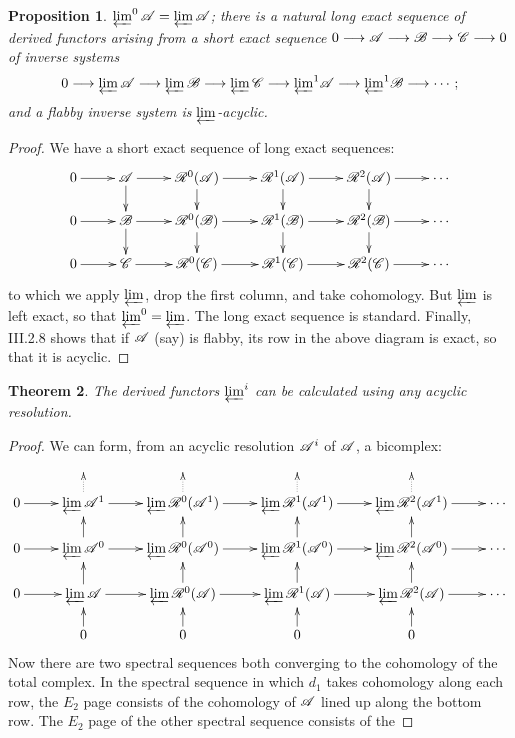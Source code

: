 \documentclass[11pt]{article}
\theoremstyle{plain}
\newtheorem{thm}{Theorem}[subsection]
\newtheorem{prop}[thm]{Proposition}
\theoremstyle{definition}
\begin{document}
{\begin{prop}
$\varprojlim^0\mathscr{A}=\varprojlim\mathscr{A}$; there is a natural long exact sequence of
derived functors arising from a short exact sequence
$0\longrightarrow\mathscr{A}\longrightarrow\mathscr{B}\longrightarrow\mathscr{C}\longrightarrow0$ of inverse systems\upcol
\[0\longrightarrow\varprojlim\mathscr{A}\longrightarrow\varprojlim\mathscr{B}\longrightarrow\varprojlim\mathscr{C}\longrightarrow
\textstyle{\varprojlim}^1\mathscr{A}\longrightarrow\textstyle{\varprojlim}^1\mathscr{B}\longrightarrow\cdots;\]
and a flabby inverse system is $\varprojlim$-acyclic.
\end{prop}
\begin{proof}We have a short exact sequence of long exact sequences:
\[\xymatrix@R=.5cm{
0\ar[r]&\scrA\ar[r]\ar[d]&\scrR^0(\scrA)\ar[r]\ar[d]&\scrR^1(\scrA)\ar[r]\ar[d]&
\scrR^2(\scrA)\ar[r]\ar[d]&\cdots\\
0\ar[r]&\scrB\ar[r]\ar[d]&\scrR^0(\scrB)\ar[r]\ar[d]&\scrR^1(\scrB)\ar[r]\ar[d]&
\scrR^2(\scrB)\ar[r]\ar[d]&\cdots\\
0\ar[r]&\scrC\ar[r]&\scrR^0(\scrC)\ar[r]&\scrR^1(\scrC)\ar[r]&\scrR^2(\scrC)
\ar[r]&\cdots
}\]
to which we apply $\varprojlim$, drop the first column, and take cohomology. But
$\varprojlim$ is left exact, so that $\varprojlim^0=\varprojlim$. The long exact
sequence is standard. Finally, III.2.8 shows that if $\mathscr{A}$ (say) is flabby,
its row in the above diagram is exact, so that it is acyclic.
\end{proof}
\begin{thm}
The derived functors $\varprojlim^i$ can be calculated using any acyclic
resolution.
\end{thm}
\begin{proof}
We can form, from an acyclic resolution $\mathscr{A}^i$ of $\mathscr{A}$, a bicomplex:
\[\providecommand{\s}{}\renewcommand{\s}{\varprojlim}
\xymatrix@R=.5cm{&&&&&\\
0\ar[r]&\s\scrA^1\ar[r]\ar@{.>}[u]&\s\scrR^0(\scrA^1)\ar[r]\ar@{.>}[u]&
\s\scrR^1(\scrA^1)\ar[r]\ar@{.>}[u]&\s\scrR^2(\scrA^1)\ar[r]\ar@{.>}[u]&\cdots\\
0\ar[r]&\s\scrA^0\ar[r]\ar[u]&\s\scrR^0(\scrA^0)\ar[r]\ar[u]&
\s\scrR^1(\scrA^0)\ar[r]\ar[u]&\s\scrR^2(\scrA^0)\ar[r]\ar[u]&\cdots\\
0\ar[r]&\s\scrA\ar[r]\ar[u]&\s\scrR^0(\scrA)\ar[r]\ar[u]&
\s\scrR^1(\scrA)\ar[r]\ar[u]&\s\scrR^2(\scrA)\ar[r]\ar[u]&\cdots\\
&0\ar[u]&0\ar[u]&0\ar[u]&0\ar[u]
}\]
Now there are two spectral sequences both converging to the cohomology of the
total complex. In the spectral sequence in which $d_1$ takes cohomology along
each row, the $E_2$ page consists of the cohomology of $\mathscr{A}$ lined up along
the bottom row. The $E_2$ page of the other spectral sequence consists of the

\end{proof}}
\end{document}
